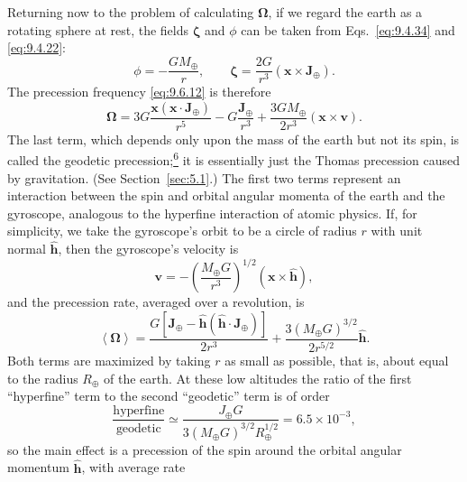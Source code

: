 Returning now to the problem of calculating \(\boldsymbol\Omega\), if we
regard the earth as a rotating sphere at rest, the fields
\(\boldsymbol\zeta\) and \(\phi\) can be taken from
Eqs.~\eqref{eq:9.4.34} and \eqref{eq:9.4.22}:
\[
  \phi=-\frac{GM_\oplus}{r},
  \qquad
  \boldsymbol\zeta
  =
  \frac{2G}{r^3}(\mathbf x\times\mathbf J_\oplus).
\]
The precession frequency \eqref{eq:9.6.12} is therefore
\begin{equation}
  \boldsymbol\Omega
  =
  3G\frac{\mathbf x(\mathbf x\cdot\mathbf J_\oplus)}{r^5}
  -G\frac{\mathbf J_\oplus}{r^3}
  {}+\frac{3GM_\oplus}{2r^3}(\mathbf x\times\mathbf v).
  \tag{9.6.17}\label{eq:9.6.17}
\end{equation}
The last term, which depends only upon the mass of the earth but not its
spin, is called the geodetic
precession;\hyperref[ch9-ref-6]{\textsuperscript{6}} it is essentially just
the Thomas precession caused by gravitation. (See Section~\ref{sec:5.1}.)
The first two terms represent an interaction between the spin and orbital
angular momenta of the earth and the gyroscope, analogous to the hyperfine
interaction of atomic physics. If, for simplicity, we take the gyroscope's
orbit to be a circle of radius \(r\) with unit normal
\(\widehat{\mathbf h}\), then the gyroscope's velocity is
\begin{equation}
  \mathbf v
  =
  -\left(\frac{M_\oplus G}{r^3}\right)^{1/2}
  (\mathbf x\times\widehat{\mathbf h}),
  \tag{9.6.18}\label{eq:9.6.18}
\end{equation}
and the precession rate, averaged over a revolution, is
\begin{equation}
  \left\langle\boldsymbol\Omega\right\rangle
  =
  \frac{G\left[
    \mathbf J_\oplus
    -\widehat{\mathbf h}
      (\widehat{\mathbf h}\cdot\mathbf J_\oplus)
  \right]}{2r^3}
  {}+\frac{3(M_\oplus G)^{3/2}}{2r^{5/2}}
  \widehat{\mathbf h}.
  \tag{9.6.19}\label{eq:9.6.19}
\end{equation}
Both terms are maximized by taking \(r\) as small as possible, that is,
about equal to the radius \(R_\oplus\) of the earth. At these low altitudes
the ratio of the first ``hyperfine'' term to the second ``geodetic'' term
is of order
\begin{equation}
  \frac{\text{hyperfine}}{\text{geodetic}}
  \simeq
  \frac{J_\oplus G}
       {3(M_\oplus G)^{3/2}R_\oplus^{1/2}}
  =
  6.5\times10^{-3},
  \tag{9.6.20}\label{eq:9.6.20}
\end{equation}
so the main effect is a precession of the spin around the orbital angular
momentum \(\widehat{\mathbf h}\), with average rate
